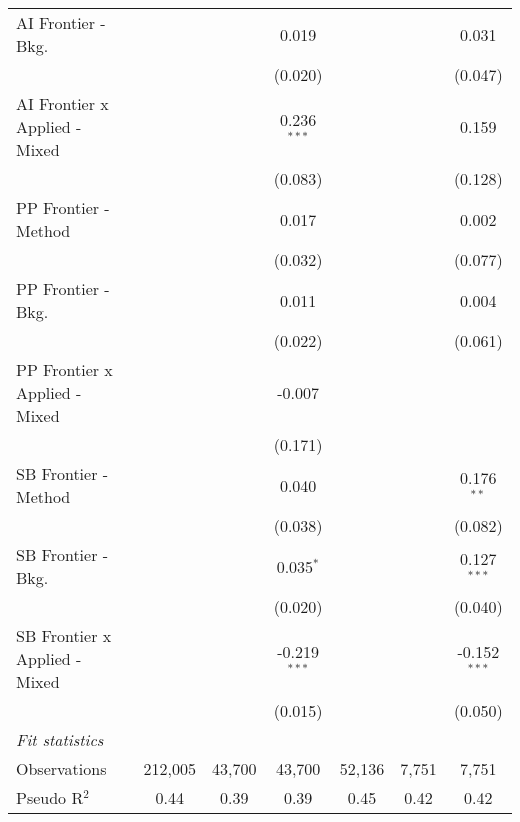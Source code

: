 \begin{tabular}{lcccccc}
   AI Frontier - Bkg.            &               &               & 0.019          &               &         & 0.031\\   
                                 &               &               & (0.020)        &               &         & (0.047)\\   
   AI Frontier x Applied - Mixed &               &               & 0.236$^{***}$  &               &         & 0.159\\   
                                 &               &               & (0.083)        &               &         & (0.128)\\   
   PP Frontier - Method          &               &               & 0.017          &               &         & 0.002\\   
                                 &               &               & (0.032)        &               &         & (0.077)\\   
   PP Frontier - Bkg.            &               &               & 0.011          &               &         & 0.004\\   
                                 &               &               & (0.022)        &               &         & (0.061)\\   
   PP Frontier x Applied - Mixed &               &               & -0.007         &               &         &   \\   
                                 &               &               & (0.171)        &               &         &   \\   
   SB Frontier - Method          &               &               & 0.040          &               &         & 0.176$^{**}$\\   
                                 &               &               & (0.038)        &               &         & (0.082)\\   
   SB Frontier - Bkg.            &               &               & 0.035$^{*}$    &               &         & 0.127$^{***}$\\   
                                 &               &               & (0.020)        &               &         & (0.040)\\   
   SB Frontier x Applied - Mixed &               &               & -0.219$^{***}$ &               &         & -0.152$^{***}$\\   
                                 &               &               & (0.015)        &               &         & (0.050)\\   
   \midrule
   \emph{Fit statistics}\\
   Observations                  & 212,005       & 43,700        & 43,700         & 52,136        & 7,751   & 7,751\\  
   Pseudo R$^2$                  & 0.44          & 0.39          & 0.39           & 0.45          & 0.42    & 0.42\\  
   

\end{tabular}
